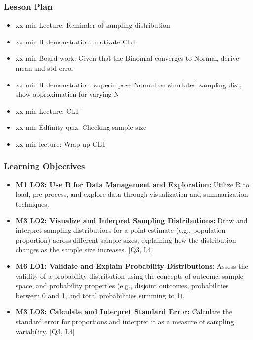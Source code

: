 

\begin{frame}
\frametitle{Lesson Plan}
\begin{itemize}
    \item xx min Lecture: Reminder of sampling distribution
    \item xx min R demonstration: motivate CLT
    \item xx min Board work: Given that the Binomial converges to Normal, derive mean and std error
    \item xx min R demonstration: superimpose Normal on simulated sampling dist, show approximation for varying N
    \item xx min Lecture: CLT
    \item xx min Edfinity quiz: Checking sample size
    \item xx min lecture: Wrap up CLT
 \end{itemize}
\end{frame}
    
\begin{frame}
\frametitle{Learning Objectives}
\begin{itemize}
    \item \textbf{M1 LO3: Use R for Data Management and Exploration:} Utilize R to load, pre-process, and explore data through visualization and summarization techniques.
    \item \textbf{M3 LO2: Visualize and Interpret Sampling Distributions:} Draw and interpret sampling distributions for a point estimate (e.g., population proportion) across different sample sizes, explaining how the distribution changes as the sample size increases. [Q3, L4]     \item \textbf{M6 LO1: Validate and Explain Probability Distributions:} Assess the validity of a probability distribution using the concepts of outcome, sample space, and probability properties (e.g., disjoint outcomes, probabilities between 0 and 1, and total probabilities summing to 1).
    \item \textbf{M3 LO3: Calculate and Interpret Standard Error:} Calculate the standard error for proportions and interpret it as a measure of sampling variability. [Q3, L4]
\end{itemize}
\end{frame}

